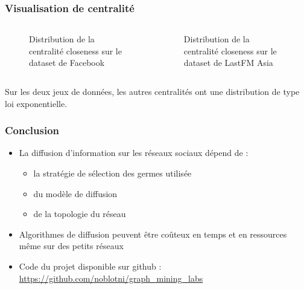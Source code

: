 \documentclass[11pt]{beamer}
\begin{document}
	\begin{frame}
		\frametitle{Visualisation de centralité}
		\begin{columns}
			\begin{column}[c]{0.5\textwidth}
				\begin{figure}
					\caption{\small Distribution de la centralité closeness sur le dataset de Facebook}
				\end{figure}
			\end{column}
			\begin{column}[c]{0.5\textwidth}
				\begin{figure}
					\caption{\small Distribution de la centralité closeness sur le dataset de LastFM Asia}
				\end{figure}
			\end{column}
		\end{columns}
	Sur les deux jeux de données, les autres centralités ont une distribution de type loi exponentielle.
	\end{frame}

	\begin{frame}
		\frametitle{Conclusion}
		
		\begin{itemize}
			\item La diffusion d'information sur les réseaux sociaux dépend de : 
		\begin{itemize}
			\item la stratégie de sélection des germes utilisée
			\item du modèle de diffusion
			\item de la topologie du réseau
		\end{itemize}
			\item Algorithmes de diffusion peuvent être coûteux en temps et en ressources même sur des petits réseaux
			\item Code du projet disponible sur github : \url{https://github.com/noblotni/graph_mining_labs}
		\end{itemize}
	
	\end{frame}
	
	
\end{document}
